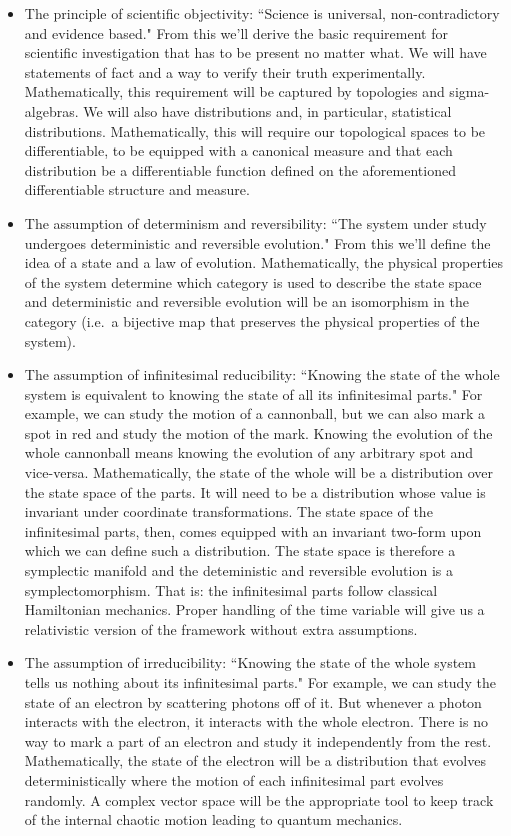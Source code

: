 \documentclass[11pt,letterpaper,fleqn]{memoir} %
\begin{document}
\begin{itemize}
	\item The principle of scientific objectivity: ``Science is universal, non-contradictory and evidence based." From this we'll derive the basic requirement for scientific investigation that has to be present no matter what. We will have statements of fact and a way to verify their truth experimentally. Mathematically, this requirement will be captured by topologies and sigma-algebras. We will also have distributions and, in particular, statistical distributions. Mathematically, this will require our topological spaces to be differentiable, to be equipped with a canonical measure and that each distribution be a differentiable function defined on the aforementioned differentiable structure and measure.
	\item The assumption of determinism and reversibility: ``The system under study undergoes deterministic and reversible evolution." From this we'll define the idea of a state and a law of evolution. Mathematically, the physical properties of the system determine which category is used to describe the state space and deterministic and reversible evolution will be an isomorphism in the category (i.e.~a bijective map that preserves the physical properties of the system).
	\item The assumption of infinitesimal reducibility: ``Knowing the state of the whole system is equivalent to knowing the state of all its infinitesimal parts." For example, we can study the motion of a cannonball, but we can also mark a spot in red and study the motion of the mark. Knowing the evolution of the whole cannonball means knowing the evolution of any arbitrary spot and vice-versa. Mathematically, the state of the whole will be a distribution over the state space of the parts. It will need to be a distribution whose value is invariant under coordinate transformations. The state space of the infinitesimal parts, then, comes equipped with an invariant two-form upon which we can define such a distribution. The state space is therefore a symplectic manifold and the deteministic and reversible evolution is a symplectomorphism. That is: the infinitesimal parts follow classical Hamiltonian mechanics. Proper handling of the time variable will give us a relativistic version of the framework without extra assumptions. 
	\item The assumption of irreducibility: ``Knowing the state of the whole system tells us nothing about its infinitesimal parts." For example, we can study the state of an electron by scattering photons off of it. But whenever a photon interacts with the electron, it interacts with the whole electron. There is no way to mark a part of an electron and study it independently from the rest. Mathematically, the state of the electron will be a distribution that evolves deterministically where the motion of each infinitesimal part evolves randomly. A complex vector space will be the appropriate tool to keep track of the internal chaotic motion leading to quantum mechanics.

\end{itemize}
\end{document}
